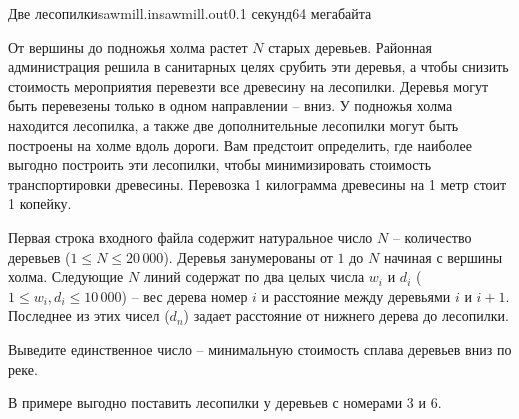 \begin{problem}{Две лесопилки}{sawmill.in}{sawmill.out}{0.1 секунд}{64 мегабайта}

От вершины до подножья холма растет $N$ старых деревьев. Районная администрация решила в
санитарных целях срубить эти деревья, а чтобы снизить стоимость мероприятия перевезти все древесину на лесопилки.
Деревья могут быть перевезены только в одном направлении -- вниз.
У подножья холма находится лесопилка, а также две дополнительные лесопилки могут быть построены на холме вдоль дороги.
Вам предстоит определить, где наиболее выгодно построить эти лесопилки, чтобы минимизировать стоимость транспортировки древесины.
Перевозка 1 килограмма древесины на 1 метр стоит 1 копейку.

\InputFile

Первая строка входного файла содержит натуральное число $N$ – количество деревьев ($1 \le N \le 20\,000$).
Деревья занумерованы от $1$ до $N$ начиная с вершины холма.
Следующие $N$ линий содержат по два целых числа $w_i$ и $d_i$ ($1 \le w_i, d_i \le 10\,000$) --
вес дерева номер $i$ и расстояние между деревьями $i$ и $i{+}1$. 
Последнее из этих чисел ($d_n$) задает расстояние от нижнего дерева до лесопилки.

\OutputFile

Выведите единственное число -- минимальную стоимость сплава деревьев вниз по реке.

\Example

\begin{example}
%
\end{example}

\Explanation

В примере выгодно поставить лесопилки у деревьев с номерами $3$ и $6$.

\end{problem}
